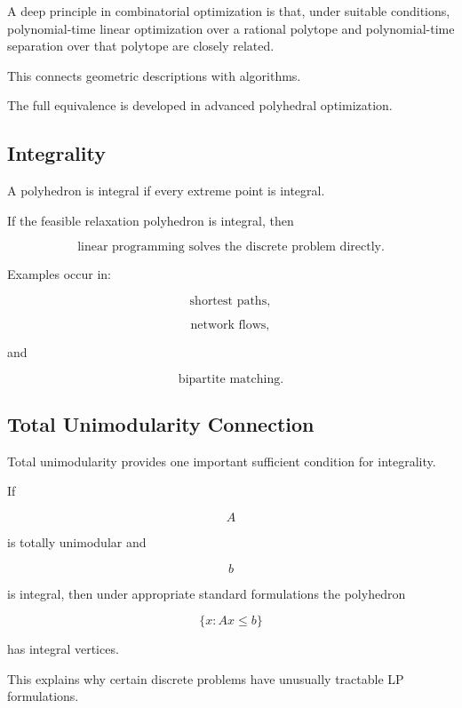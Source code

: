 A deep principle in combinatorial optimization is that, under suitable
conditions, polynomial-time linear optimization over a rational polytope
and polynomial-time separation over that polytope are closely related.

This connects geometric descriptions with algorithms.

The full equivalence is developed in advanced polyhedral optimization.

\subsection{Integrality}
\label{subsec:combinatorial-integrality}

A polyhedron is integral if every extreme point is integral.

If the feasible relaxation polyhedron is integral, then

\[
\boxed{
\text{linear programming solves the discrete problem directly}.
}
\]

Examples occur in:

\[
\boxed{
\text{shortest paths},
}
\]

\[
\boxed{
\text{network flows},
}
\]

and

\[
\boxed{
\text{bipartite matching}.
}
\]

\subsection{Total Unimodularity Connection}
\label{subsec:combinatorial-total-unimodularity}

Total unimodularity provides one important sufficient condition for
integrality.

If

\[
A
\]

is totally unimodular and

\[
b
\]

is integral, then under appropriate standard formulations the polyhedron

\[
\boxed{
\{
x:
Ax\leq b
\}
}
\]

has integral vertices.

This explains why certain discrete problems have unusually tractable LP
formulations.

